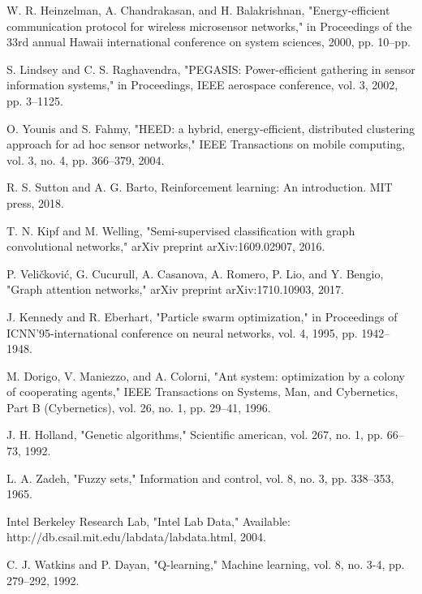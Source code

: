 \documentclass[conference]{IEEEtran}
\begin{document}
\begin{thebibliography}{99}

W. R. Heinzelman, A. Chandrakasan, and H. Balakrishnan, "Energy-efficient communication protocol for wireless microsensor networks," in Proceedings of the 33rd annual Hawaii international conference on system sciences, 2000, pp. 10--pp.

S. Lindsey and C. S. Raghavendra, "PEGASIS: Power-efficient gathering in sensor information systems," in Proceedings, IEEE aerospace conference, vol. 3, 2002, pp. 3--1125.

O. Younis and S. Fahmy, "HEED: a hybrid, energy-efficient, distributed clustering approach for ad hoc sensor networks," IEEE Transactions on mobile computing, vol. 3, no. 4, pp. 366--379, 2004.

R. S. Sutton and A. G. Barto, Reinforcement learning: An introduction. MIT press, 2018.

T. N. Kipf and M. Welling, "Semi-supervised classification with graph convolutional networks," arXiv preprint arXiv:1609.02907, 2016.

P. Veličković, G. Cucurull, A. Casanova, A. Romero, P. Lio, and Y. Bengio, "Graph attention networks," arXiv preprint arXiv:1710.10903, 2017.

J. Kennedy and R. Eberhart, "Particle swarm optimization," in Proceedings of ICNN'95-international conference on neural networks, vol. 4, 1995, pp. 1942--1948.

M. Dorigo, V. Maniezzo, and A. Colorni, "Ant system: optimization by a colony of cooperating agents," IEEE Transactions on Systems, Man, and Cybernetics, Part B (Cybernetics), vol. 26, no. 1, pp. 29--41, 1996.

J. H. Holland, "Genetic algorithms," Scientific american, vol. 267, no. 1, pp. 66--73, 1992.

L. A. Zadeh, "Fuzzy sets," Information and control, vol. 8, no. 3, pp. 338--353, 1965.

Intel Berkeley Research Lab, "Intel Lab Data," Available: http://db.csail.mit.edu/labdata/labdata.html, 2004.

C. J. Watkins and P. Dayan, "Q-learning," Machine learning, vol. 8, no. 3-4, pp. 279--292, 1992.


\end{thebibliography}
\end{document}
